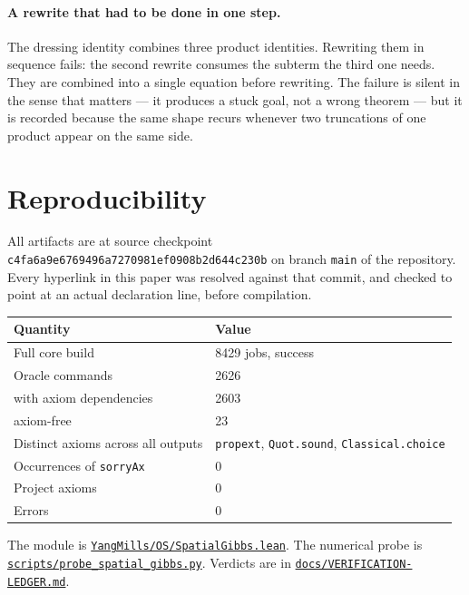 \documentclass[11pt]{article}
\theoremstyle{definition}
\newcommand{\anchor}{c4fa6a9e6769496a7270981ef0908b2d644c230b}
\newcommand{\repofile}[2]{%
  \href{https://github.com/lluiseriksson/THE-ERIKSSON-PROGRAMME/blob/\anchor/#1}{\nolinkurl{#2}}}
\begin{document}
\paragraph{A rewrite that had to be done in one step.}  The dressing identity
combines three product identities.  Rewriting them in sequence fails: the
second rewrite consumes the subterm the third one needs.  They are combined
into a single equation before rewriting.  The failure is silent in the sense
that matters --- it produces a stuck goal, not a wrong theorem --- but it is
recorded because the same shape recurs whenever two truncations of one product
appear on the same side.

\section{Reproducibility}\label{sec:repro}

All artifacts are at source checkpoint \texttt{\anchor} on branch \texttt{main}
of the repository.  Every hyperlink in this paper was resolved against that
commit, and checked to point at an actual declaration line, before compilation.

\begin{center}
\begin{tabular}{ll}
\toprule
Quantity & Value \\
\midrule
Full core build & 8429 jobs, success \\
Oracle commands & 2626 \\
\quad with axiom dependencies & 2603 \\
\quad axiom-free & 23 \\
Distinct axioms across all outputs & \texttt{propext}, \texttt{Quot.sound}, \texttt{Classical.choice} \\
Occurrences of \texttt{sorryAx} & 0 \\
Project axioms & 0 \\
Errors & 0 \\
\bottomrule
\end{tabular}
\end{center}

The module is
\repofile{YangMills/OS/SpatialGibbs.lean}{YangMills/OS/SpatialGibbs.lean}.
The numerical probe is
\repofile{scripts/probe\_spatial\_gibbs.py}{scripts/probe\_spatial\_gibbs.py}.
Verdicts are in
\repofile{docs/VERIFICATION-LEDGER.md}{docs/VERIFICATION-LEDGER.md}.
\end{document}
